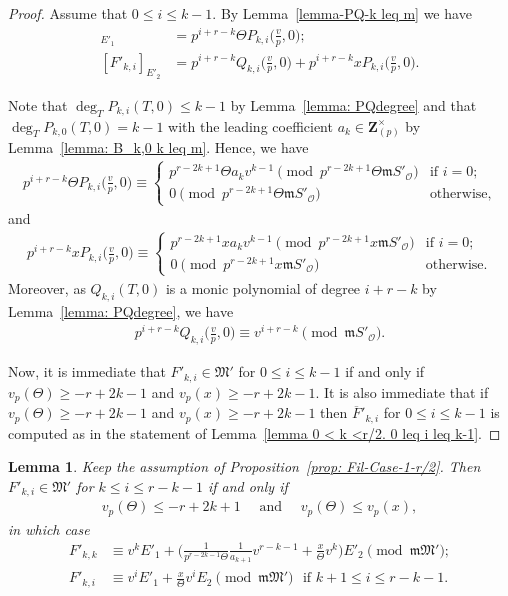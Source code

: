 \documentclass[11pt]{amsart}
\theoremstyle{definition}
\numberwithin{equation}{subsection}
\theoremstyle{plain}
\theoremstyle{plain}
\theoremstyle{plain}
\theoremstyle{plain}
\theoremstyle{plain}
\theoremstyle{plain}
\theoremstyle{plain}
\theoremstyle{plain}
\theoremstyle{plain}
\newtheorem{lemm}[equation]{Lemma}
\theoremstyle{plain}
\theoremstyle{plain}
\theoremstyle{plain}
\theoremstyle{definition}
\theoremstyle{definition}
\theoremstyle{definition}
\theoremstyle{remark}
\renewcommand{\(}{\textup{(}}
\renewcommand{\)}{\textup{)}}
\newcommand{\Z}{\mathbf{Z}}
\newcommand{\fM}{\mathfrak{M}}
\newcommand{\fm}{\mathfrak{m}}
\newcommand{\cO}{\mathcal{O}}
\newcommand{\barF}{\overline{F}}
\begin{document}
\begin{proof}
Assume that $0\leq i\leq k-1$. By Lemma~\ref{lemma-PQ-k leq m} we have
\begin{align*}
[F'_{k,i}]_{E'_1}&=p^{i+r-k}\Theta P_{k,i}\Big(\frac{v}{p},0\Big);
    \\
[F'_{k,i}]_{E'_2} &=p^{i+r-k}Q_{k,i}\Big(\frac{v}{p},0\Big)
    +p^{i+r-k}xP_{k,i}\Big(\frac{v}{p},0\Big).
\end{align*}

Note that $\deg_T P_{k,i}(T,0)\leq k-1$ by Lemma~\ref{lemma: PQdegree} and that $\deg_TP_{k,0}(T,0)=k-1$ with the leading coefficient $a_k\in\Z_{(p)}^{\times}$ by Lemma~\ref{lemma: B_k,0 k leq m}. Hence, we have
\begin{align*}
    p^{i+r-k}\Theta P_{k,i}\Big(\frac{v}{p},0\Big)
    \equiv
    \begin{cases}
        p^{r-2k+1}\Theta a_kv^{k-1}\pmod{p^{r-2k+1}\Theta\fm S'_\cO} & \mbox{if } i=0; \\
        0\pmod{p^{r-2k+1}\Theta\fm S'_\cO} & \mbox{otherwise},
    \end{cases}
\end{align*}
and
\begin{align*}
    p^{i+r-k}xP_{k,i}\Big(\frac{v}{p},0\Big)
    \equiv
    \begin{cases}
        p^{r-2k+1}xa_kv^{k-1}\pmod{p^{r-2k+1}x\fm S'_\cO} & \mbox{if } i=0; \\
        0 \pmod{p^{r-2k+1}x\fm S'_\cO} & \mbox{otherwise}.
    \end{cases}
\end{align*}
Moreover, as  $Q_{k,i}(T,0)$ is a monic polynomial of degree $i+r-k$ by Lemma~\ref{lemma: PQdegree}, we have
\begin{align*}
    p^{i+r-k}Q_{k,i}\Big(\frac{v}{p},0\Big)
    \equiv v^{i+r-k} \pmod{\fm S'_\cO}.
\end{align*}

Now, it is immediate that $F'_{k,i}\in\fM'$ for $0\leq i\leq k-1$ if and only if $v_p(\Theta)\geq -r+2k-1$ and $v_p(x)\geq -r+2k-1$. It is also immediate that if $v_p(\Theta)\geq -r+2k-1$ and $v_p(x)\geq -r+2k-1$ then $\barF'_{k,i}$ for $0\leq i\leq k-1$ is computed as in the statement of Lemma~\ref{lemma 0 < k <r/2. 0 leq i leq k-1}.
\end{proof}

\begin{lemm}\label{lemma 0 < k <r/2. k leq i leq r-k-1}
Keep the assumption of Proposition~\ref{prop: Fil-Case-1-r/2}. Then $F'_{k,i}\in\fM'$ for $k\leq i\leq r-k-1$ if and only if
\begin{align*}
    v_p(\Theta)\leq -r+2k+1
    \quad\mbox{ and }\quad
    v_p(\Theta)\leq v_p(x),
\end{align*}
in which case
\begin{align*}
F'_{k,k}
    &\equiv
    v^kE'_1+\bigg(
    \frac{1}{p^{r-2k-1}\Theta}\frac{1}{a_{k+1}}v^{r-k-1}+\frac{x}{\Theta}v^k
    \bigg)E'_2
    \pmod{\fm\fM'};
    \\
F'_{k,i}
    &\equiv
    v^iE'_1+\frac{x}{\Theta}v^iE_2 \pmod{\fm\fM'}\,\,\mbox{ if }k+1\leq i\leq r-k-1.
\end{align*}
\end{lemm}
\end{document}
